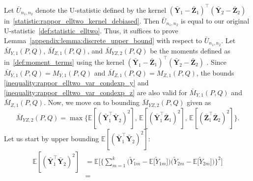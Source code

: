 \documentclass[twoside,11pt]{article}
\newcommand{\rvTwo}{Y}
\newcommand{\rvThree}{Z}
\newcommand{\vectorize}[1]{\mathbf{#1}}
\newcommand{\private}[1]{\tilde{#1}}
\newcommand{\mE}{\mathbb{E}} %
\newcommand{\alphabetSize}{k} %
\newcommand{\vectorIndex}{m}
\newcommand{\sampleSize}{n}
\newcommand{\kernelMoment}{M} %
\newcommand{\dataGenDist}{P}  %
\newcommand{\privacyMechanism}{Q}
\newcommand{\momentTwosampleVarCondexpY}{\kernelMoment_{\rvTwo,1}(\dataGenDist, \privacyMechanism)}
\newcommand{\momentTwosampleVarCondexpZ}{\kernelMoment_{\rvThree,1}(\dataGenDist, \privacyMechanism)}
\newcommand{\momentTwosampleVarCondexpBarY}{\bar{\kernelMoment}_{\rvTwo, 1}(\dataGenDist, \privacyMechanism)}
\newcommand{\momentTwosampleVarCondexpBarZ}{\bar{\kernelMoment}_{\rvThree, 1}(\dataGenDist, \privacyMechanism)}
\newcommand{\momentTwosampleExpSquareBar}{\bar{\kernelMoment}_{\rvTwo \rvThree,2}(\dataGenDist, \privacyMechanism)}
\begin{document}
\begin{appendix}
\begin{itemize}
	Let \(\bar{U}_{\sampleSize_1, \sampleSize_2}\) denote the U-statistic defined by the kernel $(\bar{\vectorize{\rvTwo}}_{1} - \bar{\vectorize{\rvThree}}_{1})^\top (\bar{\vectorize{\rvTwo}}_{2} - \bar{\vectorize{\rvThree}}_{2})$ in~\eqref{statistic:rappor_elltwo_kernel_debiased}. Then \(\bar{U}_{\sampleSize_1, \sampleSize_2}\) is equal to our original U-statistic~\eqref{def:statistic_elltwo}. Thus, it suffices to prove Lemma~\ref{appendix:lemma:discrete_upper_bound} with respect to \(\bar{U}_{\sampleSize_1, \sampleSize_2}\). Let \(\momentTwosampleVarCondexpBarY\), \(\momentTwosampleVarCondexpBarZ\), and \(\momentTwosampleExpSquareBar\) be the moments defined as in~\eqref{def:moment_terms} using the kernel $(\bar{\vectorize{\rvTwo}}_{1} - \bar{\vectorize{\rvThree}}_{1})^\top (\bar{\vectorize{\rvTwo}}_{2} - \bar{\vectorize{\rvThree}}_{2})$ . Since \(\momentTwosampleVarCondexpBarY = \momentTwosampleVarCondexpY\) and \(\momentTwosampleVarCondexpBarZ = \momentTwosampleVarCondexpZ\), the bounds \eqref{inequality:rappor_elltwo_var_condexp_y} and \eqref{inequality:rappor_elltwo_var_condexp_z} are also valid for \(\momentTwosampleVarCondexpBarY\) and \(\momentTwosampleVarCondexpBarZ\). Now, we move on to bounding \(\momentTwosampleExpSquareBar\) given as
	\begin{equation*}
		\momentTwosampleExpSquareBar
		=
		\max
		\{
		\mE[
		(
		\bar{\vectorize{\rvTwo}}_1^\top 
		\bar{\vectorize{\rvTwo}}_2
		)^2
		], \, 
		\mE[
		(
		\bar{\vectorize{\rvTwo}}_1^\top
		\bar{\vectorize{\rvThree}}_1)^2], \,
		\mE[
		(
		\bar{\vectorize{\rvThree}}_1^\top
		\bar{\vectorize{\rvThree}}_2)^2
		]
		\}.
	\end{equation*}
	Let us start by upper bounding $\mE[
	(
	\bar{\vectorize{\rvTwo}}_1^\top 
	\bar{\vectorize{\rvTwo}}_2
	)^2
	]$:
	\begin{align*}
		\mE[
		(
		\bar{\vectorize{\rvTwo}}_1^\top 
		\bar{\vectorize{\rvTwo}}_2
		)^2
		]
		&=
		\mE
		\biggl[ %
		\biggl\{%
		\sum_{\vectorIndex = 1}^\alphabetSize %
		\bigl( %
		\private{\rvTwo}_{1 \vectorIndex}
		- %
		\mE
		\bigl[
		\private{\rvTwo}_{1 \vectorIndex}
		\bigr]
		\bigr)%
		\bigl( %
		\private{\rvTwo}_{2 \vectorIndex}
		-
		\mE
		\bigl[
		\private{\rvTwo}_{2 \vectorIndex}
		\bigr]
		\bigr)%
		\biggl\}^2 %
		\biggr]
		\\&= %

\end{align*}
\end{itemize}
\end{appendix}
\end{document}

